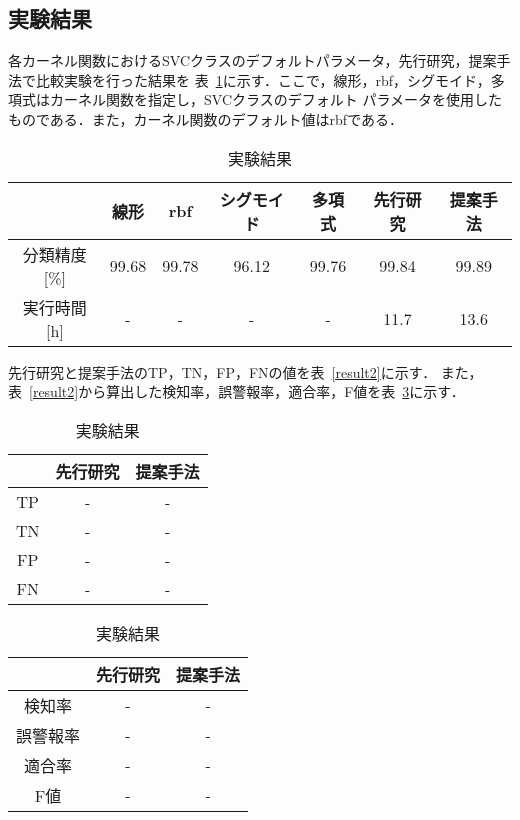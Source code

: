 \subsection{実験結果}
各カーネル関数におけるSVCクラスのデフォルトパラメータ，先行研究，提案手法で比較実験を行った結果を
表~\ref{result1}に示す．ここで，線形，rbf，シグモイド，多項式はカーネル関数を指定し，SVCクラスのデフォルト
パラメータを使用したものである．また，カーネル関数のデフォルト値はrbfである．
\begin{table}[h]
    \centering
    \caption{実験結果}  %
    \begin{tabular}{|c|c|c|c|c|c|c|}  %
        \hline  %
        ~ & 線形 &rbf &シグモイド&多項式&先行研究 & 提案手法\\  %
        \hline  %
        分類精度[\%]& 99.68&99.78&96.12&99.76&99.84& 99.89\\  %
        \hline  %
        実行時間[h] & - & -&-&-&11.7& 13.6\\  %
        \hline  %
    \end{tabular}
    \label{result1}  %
  \end{table}
  先行研究と提案手法のTP，TN，FP，FNの値を表~\ref{result2}に示す．
また，表~\ref{result2}から算出した検知率，誤警報率，適合率，F値を表~\ref{result3}に示す．
\begin{table}

\begin{minipage}[h]
    \centering
    \caption{実験結果}  %
    \begin{tabular}{|c|c|c|}  %
        \hline  %
        ~ &先行研究 & 提案手法\\  %
        \hline  %
        TP& -& -\\  %
        \hline  %
        TN & -& -\\  %
        \hline  %
        FP & -& -\\  %
        \hline  %
        FN& -& -\\  %
        \hline  %
    \end{tabular}
    \label{result2}  %
\end{minipage}
  \begin{minipage}[h]
    \centering
    \caption{実験結果}  %
    \begin{tabular}{|c|c|c|}  %
        \hline  %
        ~ &先行研究 & 提案手法\\  %
        \hline  %
        検知率& -& -\\  %
        \hline  %
        誤警報率 & -& -\\  %
        \hline  %
        適合率 & -& -\\  %
        \hline  %
        F値 & -& -\\  %
        \hline  %
    \end{tabular}
    \label{result3}  %
  \end{minipage}
\end{table}